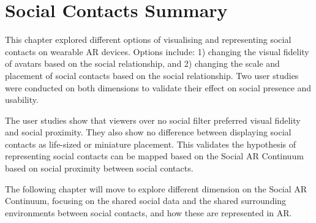 \section{Social Contacts Summary}

This chapter explored different options of visualising and representing social contacts on wearable AR devices. Options include: 1) changing the visual fidelity of avatars based on the social relationship, and 2) changing the scale and placement of social contacts based on the social relationship. Two user studies were conducted on both dimensions to validate their effect on social presence and usability. 

The user studies show that viewers over no social filter preferred visual fidelity and social proximity. They also show no difference between displaying social contacts as life-sized or miniature placement. This validates the hypothesis of representing social contacts can be mapped based on the Social AR Continuum based on social proximity between social contacts. 

The following chapter will move to explore different dimension on the Social AR Continuum, focusing on the shared social data and the shared surrounding environments between social contacts, and how these are represented in AR. 


